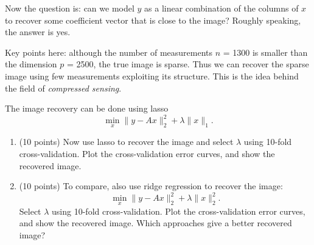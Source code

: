 \documentclass[twoside,10pt]{article}
\begin{document}
\begin{enumerate}
Now the question is: can we model $y$ as a linear combination of the columns of $x$ to recover some coefficient vector that is close to the image? Roughly speaking, the answer is yes. 

Key points here: although the number of measurements $n$ = 1300 is smaller than the dimension $p$ = 2500, the true image is sparse. Thus we can recover the sparse image using few measurements exploiting its structure. This is the idea behind the field of \textit{compressed sensing}. 

The image recovery can be done using lasso
\[
\min_x \|y-Ax\|_2^2 + \lambda \|x\|_1.
\]
\begin{enumerate}
\item (10 points) Now use lasso to recover the image and select $\lambda$ using 10-fold cross-validation. Plot the cross-validation error curves, and show the recovered image. 
\item (10 points) To compare, also use ridge regression to recover the image:
\[
\min_x \|y-Ax\|_2^2 + \lambda \|x\|_2^2.
\]
Select $\lambda$ using 10-fold cross-validation. Plot the cross-validation error curves, and show the recovered image. Which approaches give a better recovered image?
\end{enumerate}



\end{enumerate}
\end{document}
